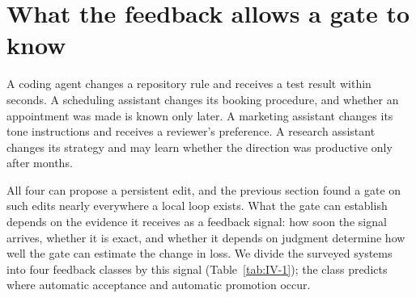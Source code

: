 \documentclass[
  11pt,
]{article}
\begin{document}
\section{What the feedback allows a gate to know}\label{sec:signal}

A coding agent changes a repository rule and receives a test result within seconds. A scheduling assistant changes its booking procedure, and whether an appointment was made is known only later. A marketing assistant changes its tone instructions and receives a reviewer's preference. A research assistant changes its strategy and may learn whether the direction was productive only after months.

All four can propose a persistent edit, and the previous section found a gate on such edits nearly everywhere a local loop exists. What the gate can establish depends on the evidence it receives as a feedback signal: how soon the signal arrives, whether it is exact, and whether it depends on judgment determine how well the gate can estimate the change in loss. We divide the surveyed systems into four feedback classes by this signal (Table~\ref{tab:IV-1}); the class predicts where automatic acceptance and automatic promotion occur.
\end{document}
